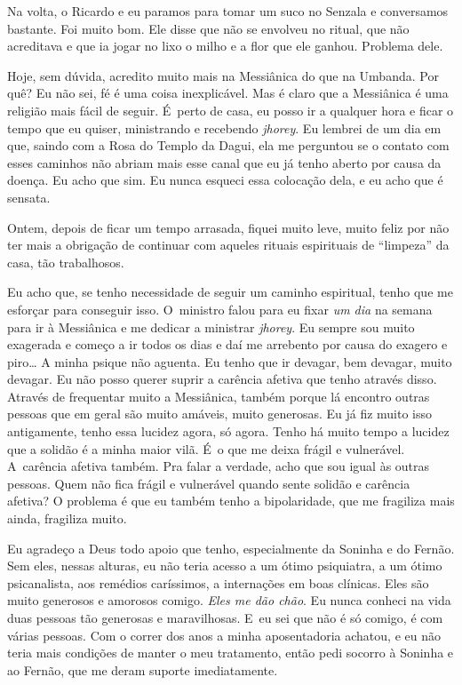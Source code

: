 Na volta, o Ricardo e eu paramos para tomar um suco no Senzala e
conversamos bastante. Foi muito bom. Ele disse que não se envolveu no
ritual, que não acreditava e que ia jogar no lixo o milho e a flor que
ele ganhou. Problema dele.

Hoje, sem dúvida, acredito muito mais na Messiânica do que na Umbanda.
Por quê? Eu não sei, fé é uma coisa inexplicável. Mas é claro que a
Messiânica é uma religião mais fácil de seguir. É~perto de casa, eu
posso ir a qualquer hora e ficar o tempo que eu quiser, ministrando e
recebendo \emph{jhorey}. Eu lembrei de um dia em que, saindo com a Rosa
do Templo da Dagui, ela me perguntou se o contato com esses caminhos não
abriam mais esse canal que eu já tenho aberto por causa da doença. Eu
acho que sim. Eu nunca esqueci essa colocação dela, e eu acho que é
sensata.

Ontem, depois de ficar um tempo arrasada, fiquei muito leve, muito feliz
por não ter mais a obrigação de continuar com aqueles rituais
espirituais de ``limpeza'' da casa, tão trabalhosos.

Eu acho que, se tenho necessidade de seguir um caminho espiritual, tenho
que me esforçar para conseguir isso. O~ministro falou para eu fixar
\emph{um dia} na semana para ir à Messiânica e me dedicar a ministrar
\emph{jhorey}. Eu sempre sou muito exagerada e começo a ir todos os dias
e daí me arrebento por causa do exagero e piro… A minha
psique não aguenta. Eu tenho que ir devagar, bem devagar, muito devagar.
Eu não posso querer suprir a carência afetiva que tenho através disso.
Através de frequentar muito a Messiânica, também porque lá encontro
outras pessoas que em geral são muito amáveis, muito generosas. Eu já
fiz muito isso antigamente, tenho essa lucidez agora, só agora. Tenho há
muito tempo a lucidez que a solidão é a minha maior vilã. É~o que me
deixa frágil e vulnerável. A~carência afetiva também. Pra falar a
verdade, acho que sou igual às outras pessoas. Quem não fica frágil e
vulnerável quando sente solidão e carência afetiva? O problema é que eu
também tenho a bipolaridade, que me fragiliza mais ainda, fragiliza
muito.

Eu agradeço a Deus todo apoio que tenho, especialmente da Soninha e do
Fernão. Sem eles, nessas alturas, eu não teria acesso a um ótimo
psiquiatra, a um ótimo psicanalista, aos remédios caríssimos, a
internações em boas clínicas. Eles são muito generosos e amorosos
comigo. \emph{Eles me dão chão}. Eu nunca conheci na vida duas pessoas
tão generosas e maravilhosas. E~eu sei que não é só comigo, é com várias
pessoas. Com o correr dos anos a minha aposentadoria achatou, e eu não
teria mais condições de manter o meu tratamento, então pedi socorro à
Soninha e ao Fernão, que me deram suporte imediatamente.

